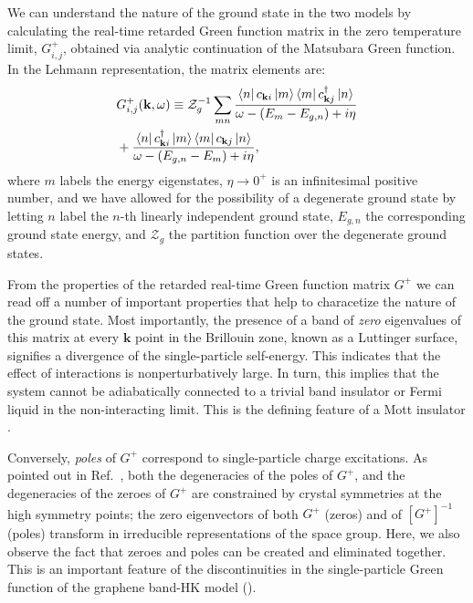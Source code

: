 \documentclass[prb,aps,amssymb,twocolumn,notitlepage]{revtex4-2}
\begin{document}
We can understand the nature of the ground state in the two models by calculating the real-time retarded Green function matrix in the zero temperature limit, $G^{+}_{i,j}$, obtained via analytic continuation of the Matsubara Green function.
In the Lehmann representation, the matrix elements are:
\begin{align}
\label{eq:gfmatrix}
    &G^{+}_{i,j}(\mathbf{k},\omega)\equiv\mathcal{Z}_{g}^{-1}\sum_{mn}\frac{\bra{n}c_{\mathbf{k}i}\ket{m}\bra{m}c^\dagger_{\mathbf{k}j}\ket{n}}{\omega-(E_{m}-E_{g,n})+i\eta}\\
&+\frac{\bra{n}c^\dagger_{\mathbf{k}i}\ket{m}\bra{m}c_{\mathbf{k}j}\ket{n}}{\omega-(E_{g,n}-E_{m})+i\eta} ,\nonumber
\end{align}
where $m$ labels the energy eigenstates, $\eta\rightarrow 0^+$ is an infinitesimal positive number, and we have allowed for the possibility of a degenerate ground state by letting $n$ label the $n$-th linearly independent ground state, $E_{g,n}$ the corresponding ground state energy, and $\mathcal{Z}_{g}$ the partition function over the degenerate ground states.

From the properties of the retarded real-time Green function matrix $G^{+}$ we can read off a number of important properties that help to characetize the nature of the ground state.
Most importantly, the presence of a band of \textit{zero} eigenvalues of this matrix at every $\mathbf{k}$ point in the Brillouin zone, known as a Luttinger surface, signifies a divergence of the single-particle self-energy.
This indicates that the effect of interactions is nonperturbatively large.  
In turn, this implies that the system cannot be adiabatically connected to a trivial band insulator or Fermi liquid in the non-interacting limit. 
This is the defining feature of a Mott insulator \cite{dave2013absence}.

Conversely, \textit{poles} of $G^{+}$ correspond to single-particle charge excitations. 
As pointed out in Ref.~\cite{setty2023symmetry}, both the degeneracies of the poles of $G^{+}$, and the degeneracies of the zeroes of $G^{+}$ are constrained by crystal symmetries at the high symmetry points; the zero eigenvectors of both $G^{+}$ (zeros) and of $[G^{+}]^{-1}$ (poles) transform in irreducible representations of the space group. 
Here, we also observe the fact that zeroes and poles can be created and eliminated together.
This is an important feature of the discontinuities in the single-particle Green function of the graphene band-HK model ().
\end{document}
